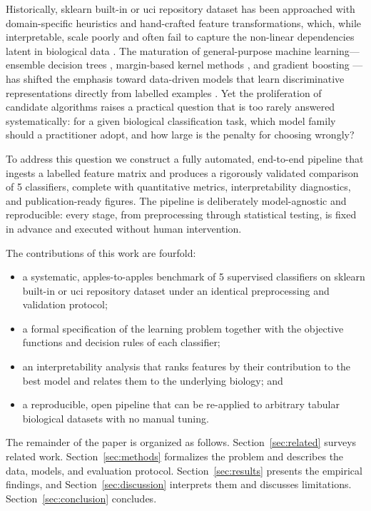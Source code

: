 \documentclass[conference]{IEEEtran}
\begin{document}
Historically, sklearn built-in or uci repository dataset has been approached with domain-specific heuristics and
hand-crafted feature transformations, which, while interpretable, scale poorly and often fail
to capture the non-linear dependencies latent in biological data \cite{hastie2009elements}.
The maturation of general-purpose machine learning---ensemble decision trees
\cite{breiman2001random}, margin-based kernel methods \cite{cortes1995support}, and gradient
boosting \cite{friedman2001greedy}---has shifted the emphasis toward data-driven models that
learn discriminative representations directly from labelled examples \cite{lecun2015deep}.
Yet the proliferation of candidate algorithms raises a practical question that is too rarely
answered systematically: for a given biological classification task, which model family should
a practitioner adopt, and how large is the penalty for choosing wrongly?

To address this question we construct a fully automated, end-to-end pipeline that ingests a
labelled feature matrix and produces a rigorously validated comparison of 5 classifiers,
complete with quantitative metrics, interpretability diagnostics, and publication-ready figures.
The pipeline is deliberately model-agnostic and reproducible: every stage, from preprocessing
through statistical testing, is fixed in advance and executed without human intervention.

The contributions of this work are fourfold:
\begin{itemize}
\item a systematic, apples-to-apples benchmark of 5 supervised classifiers on
sklearn built-in or uci repository dataset under an identical preprocessing and validation protocol;
\item a formal specification of the learning problem together with the objective functions
and decision rules of each classifier;
\item an interpretability analysis that ranks features by their contribution to the best model
and relates them to the underlying biology; and
\item a reproducible, open pipeline that can be re-applied to arbitrary tabular biological
datasets with no manual tuning.
\end{itemize}

The remainder of the paper is organized as follows. Section~\ref{sec:related} surveys related
work. Section~\ref{sec:methods} formalizes the problem and describes the data, models, and
evaluation protocol. Section~\ref{sec:results} presents the empirical findings, and
Section~\ref{sec:discussion} interprets them and discusses limitations. Section~\ref{sec:conclusion}
concludes.
\end{document}
